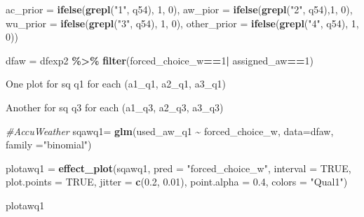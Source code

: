\documentclass[
  11pt,
]{article}
\newenvironment{Shaded}{\begin{snugshade}}{\end{snugshade}}
\newcommand{\AttributeTok}[1]{\textcolor[rgb]{0.13,0.29,0.53}{#1}}
\newcommand{\CommentTok}[1]{\textcolor[rgb]{0.56,0.35,0.01}{\textit{#1}}}
\newcommand{\ConstantTok}[1]{\textcolor[rgb]{0.56,0.35,0.01}{#1}}
\newcommand{\DecValTok}[1]{\textcolor[rgb]{0.00,0.00,0.81}{#1}}
\newcommand{\FloatTok}[1]{\textcolor[rgb]{0.00,0.00,0.81}{#1}}
\newcommand{\FunctionTok}[1]{\textcolor[rgb]{0.13,0.29,0.53}{\textbf{#1}}}
\newcommand{\NormalTok}[1]{#1}
\newcommand{\OtherTok}[1]{\textcolor[rgb]{0.56,0.35,0.01}{#1}}
\newcommand{\SpecialCharTok}[1]{\textcolor[rgb]{0.81,0.36,0.00}{\textbf{#1}}}
\newcommand{\StringTok}[1]{\textcolor[rgb]{0.31,0.60,0.02}{#1}}
\begin{document}
\begin{Shaded}
\begin{Highlighting}[]
         \AttributeTok{ac\_prior =} \FunctionTok{ifelse}\NormalTok{(}\FunctionTok{grepl}\NormalTok{(}\StringTok{"1"}\NormalTok{, q54), }\DecValTok{1}\NormalTok{, }\DecValTok{0}\NormalTok{),}
         \AttributeTok{aw\_pior =} \FunctionTok{ifelse}\NormalTok{(}\FunctionTok{grepl}\NormalTok{(}\StringTok{"2"}\NormalTok{, q54),}\DecValTok{1}\NormalTok{, }\DecValTok{0}\NormalTok{),}
         \AttributeTok{wu\_prior =} \FunctionTok{ifelse}\NormalTok{(}\FunctionTok{grepl}\NormalTok{(}\StringTok{"3"}\NormalTok{, q54), }\DecValTok{1}\NormalTok{, }\DecValTok{0}\NormalTok{),}
         \AttributeTok{other\_prior =} \FunctionTok{ifelse}\NormalTok{(}\FunctionTok{grepl}\NormalTok{(}\StringTok{"4"}\NormalTok{, q54), }\DecValTok{1}\NormalTok{, }\DecValTok{0}\NormalTok{))}
\end{Highlighting}
\end{Shaded}

\begin{Shaded}
\begin{Highlighting}[]
\NormalTok{dfaw }\OtherTok{=}\NormalTok{ dfexp2 }\SpecialCharTok{\%\textgreater{}\%} 
  \FunctionTok{filter}\NormalTok{(forced\_choice\_w}\SpecialCharTok{==}\DecValTok{1}\SpecialCharTok{|}\NormalTok{ assigned\_aw}\SpecialCharTok{==}\DecValTok{1}\NormalTok{) }
\end{Highlighting}
\end{Shaded}

One plot for sq q1 for each (a1\_q1, a2\_q1, a3\_q1)

Another for sq q3 for each (a1\_q3, a2\_q3, a3\_q3)

\begin{Shaded}
\begin{Highlighting}[]
\CommentTok{\#AccuWeather}
\NormalTok{sqawq1}\OtherTok{=} \FunctionTok{glm}\NormalTok{(used\_aw\_q1 }\SpecialCharTok{\textasciitilde{}}\NormalTok{ forced\_choice\_w, }\AttributeTok{data=}\NormalTok{dfaw, }\AttributeTok{family =}\StringTok{"binomial"}\NormalTok{)}

\NormalTok{plotawq1 }\OtherTok{=} \FunctionTok{effect\_plot}\NormalTok{(sqawq1, }\AttributeTok{pred =} \StringTok{"forced\_choice\_w"}\NormalTok{, }\AttributeTok{interval =} \ConstantTok{TRUE}\NormalTok{, }\AttributeTok{plot.points =} \ConstantTok{TRUE}\NormalTok{, }\AttributeTok{jitter =} \FunctionTok{c}\NormalTok{(}\FloatTok{0.2}\NormalTok{, }\FloatTok{0.01}\NormalTok{), }\AttributeTok{point.alpha =} \FloatTok{0.4}\NormalTok{, }\AttributeTok{colors =} \StringTok{"Qual1"}\NormalTok{)}

\NormalTok{plotawq1}
\end{Highlighting}
\end{Shaded}
\end{document}
